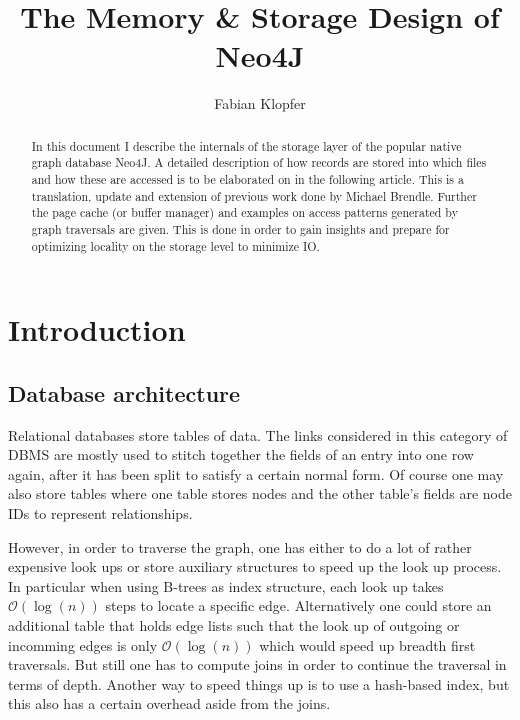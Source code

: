 \documentclass[a4paper,10pt]{article}
\title{The Memory \& Storage Design of Neo4J}
\author{Fabian Klopfer}
\begin{document}
\maketitle
\vspace{2cm}

\begin{abstract}
In this document I describe the internals of the storage layer of the popular native graph database Neo4J. 
    A detailed description of how records are stored into which files and how these are accessed is to be elaborated on in the following article.
    This is a translation, update and extension of previous work done by Michael Brendle. 
    Further the page cache (or buffer manager) and examples on access patterns generated by graph traversals are given. 
    This is done in order to gain insights and prepare for optimizing locality on the storage level to minimize IO\@.
\end{abstract} \newpage

\tableofcontents \newpage

\section{Introduction}
    \subsection{Database architecture}
        Relational databases store tables of data.
        The links considered in this category of DBMS are mostly used to stitch together the fields of an entry into one row again, after it has been split to satisfy a certain normal form.
        Of course one may also store tables where one table stores nodes and the other table's fields are node IDs to represent relationships.

        However, in order to traverse the graph, one has either to do a lot of rather expensive look ups or store auxiliary structures to speed up the look up process.
        In particular when using B-trees as index structure, each look up takes $\mathcal{O}(\log(n))$ steps to locate a specific edge.
        Alternatively one could store an additional table that holds edge lists such that the look up of outgoing or incomming edges is only $\mathcal{O}(\log(n))$ which would speed up breadth first traversals.
        But still one has to compute joins in order to continue the traversal in terms of depth.
        Another way to speed things up is to use a hash-based index, but this also has a certain overhead aside from the joins.
\end{document}
